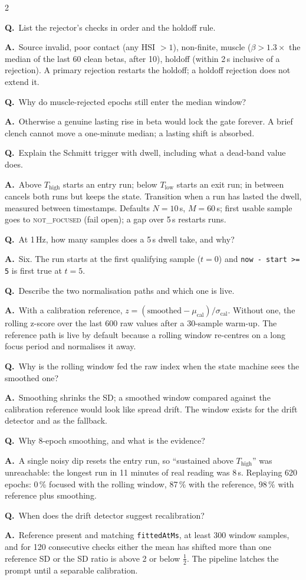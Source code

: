 \documentclass[10pt,a4paper]{article}
\newcommand{\code}[1]{\texttt{#1}}                  %
\newcommand{\state}[1]{\textsc{\small #1}}          %
\newcommand{\Thigh}{T_{\mathrm{high}}}
\newcommand{\Tlow}{T_{\mathrm{low}}}
\newcounter{qnum}
\newcommand{\Q}[2]{\stepcounter{qnum}\par\medskip\noindent
  \textbf{Q\theqnum.}\ #1\par\nobreak\smallskip\noindent
  {\color{teal}\textbf{A.}}\ #2\par}
\begin{document}
\begin{multicols}{2}
\Q{List the rejector's checks in order and the holdoff rule.}{Source invalid, poor contact (any HSI
$>1$), non-finite, muscle ($\beta > 1.3\times$ the median of the last 60 clean betas, after 10),
holdoff (within 2\,s inclusive of a rejection). A primary rejection restarts the holdoff; a holdoff
rejection does not extend it.}

\Q{Why do muscle-rejected epochs still enter the median window?}{Otherwise a genuine lasting rise
in beta would lock the gate forever. A brief clench cannot move a one-minute median; a lasting
shift is absorbed.}

\Q{Explain the Schmitt trigger with dwell, including what a dead-band value does.}{Above $\Thigh$
starts an entry run; below $\Tlow$ starts an exit run; in between cancels both runs but keeps the
state. Transition when a run has lasted the dwell, measured between timestamps. Defaults $N=10$\,s,
$M=60$\,s; first usable sample goes to \state{not\_focused} (fail open); a gap over 5\,s restarts
runs.}

\Q{At 1\,Hz, how many samples does a 5\,s dwell take, and why?}{Six. The run starts at the first
qualifying sample ($t=0$) and \code{now - start >= 5} is first true at $t=5$.}

\Q{Describe the two normalisation paths and which one is live.}{With a calibration reference,
$z = (\text{smoothed} - \mu_{\text{cal}})/\sigma_{\text{cal}}$. Without one, the rolling z-score
over the last 600 raw values after a 30-sample warm-up. The reference path is live by default
because a rolling window re-centres on a long focus period and normalises it away.}

\Q{Why is the rolling window fed the raw index when the state machine sees the smoothed one?}
{Smoothing shrinks the SD; a smoothed window compared against the calibration reference would
look like spread drift. The window exists for the drift detector and as the fallback.}

\Q{Why 8-epoch smoothing, and what is the evidence?}{A single noisy dip resets the entry run, so
``sustained above $\Thigh$'' was unreachable: the longest run in 11 minutes of real reading was
8\,s. Replaying 620 epochs: 0\,\% focused with the rolling window, 87\,\% with the reference, 98\,\%
with reference plus smoothing.}

\Q{When does the drift detector suggest recalibration?}{Reference present and matching
\code{fittedAtMs}, at least 300 window samples, and for 120 consecutive checks either the mean has
shifted more than one reference SD or the SD ratio is above 2 or below $\tfrac12$. The pipeline
latches the prompt until a separable calibration.}


\end{multicols}
\end{document}
